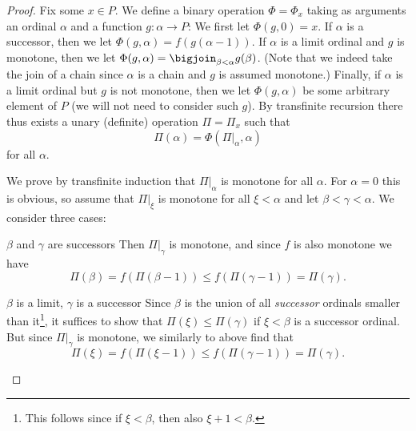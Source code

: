 \begin{proof}
    Fix some $x \in P$. We define a binary operation $\Phi = \Phi_x$ taking as arguments an ordinal $\alpha$ and a function $g \colon \alpha \to P$: We first let $\Phi(g,0) = x$. If $\alpha$ is a successor, then we let $\Phi(g,\alpha) = f(g(\alpha-1))$. If $\alpha$ is a limit ordinal and $g$ is monotone, then we let $\Phi(g,\alpha) = \bigjoin_{\beta < \alpha} g(\beta)$. (Note that we indeed take the join of a chain since $\alpha$ is a chain and $g$ is assumed monotone.) Finally, if $\alpha$ is a limit ordinal but $g$ is not monotone, then we let $\Phi(g,\alpha)$ be some arbitrary element of $P$ (we will not need to consider such $g$). By transfinite recursion there thus exists a unary (definite) operation $\Pi = \Pi_x$ such that
    \begin{equation*}
        \Pi(\alpha)
            = \Phi(\Pi|_\alpha, \alpha)
    \end{equation*}
    for all $\alpha$.
    
    We prove by transfinite induction that $\Pi|_\alpha$ is monotone for all $\alpha$. For $\alpha = 0$ this is obvious, so assume that $\Pi|_\xi$ is monotone for all $\xi < \alpha$ and let $\beta < \gamma < \alpha$. We consider three cases:
    \begin{proofsec}
        \item[$\beta$ and $\gamma$ are successors]
        Then $\Pi|_\gamma$ is monotone, and since $f$ is also monotone we have
        \begin{equation*}
            \Pi(\beta)
                = f(\Pi(\beta-1))
                \leq f(\Pi(\gamma-1))
                = \Pi(\gamma).
        \end{equation*}

        \item[$\beta$ is a limit, $\gamma$ is a successor]
        Since $\beta$ is the union of all \emph{successor} ordinals smaller than it\footnote{This follows since if $\xi < \beta$, then also $\xi + 1 < \beta$.}, it suffices to show that $\Pi(\xi) \leq \Pi(\gamma)$ if $\xi < \beta$ is a successor ordinal. But since $\Pi|_\gamma$ is monotone, we similarly to above find that
        \begin{equation*}
            \Pi(\xi)
                = f(\Pi(\xi-1))
                \leq f(\Pi(\gamma-1))
                = \Pi(\gamma).
        \end{equation*}


\end{proofsec}
\end{proof}
